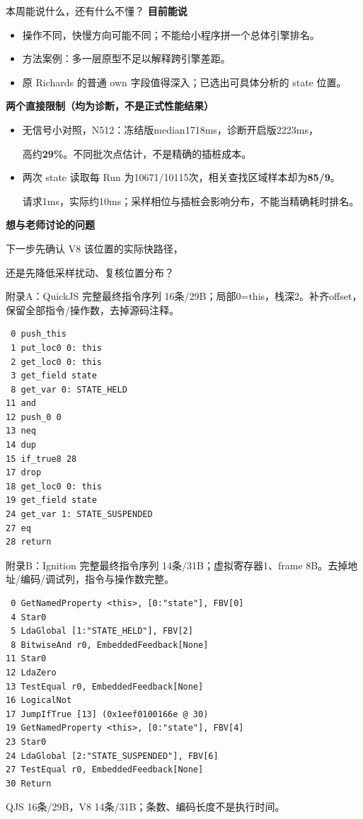 \documentclass[UTF8,aspectratio=169,10pt,fontset=fandol]{ctexbeamer}
\newcommand{\DiagNote}{诊断数据，不作正式性能结果。}
\newcommand{\PageSource}{}
\newcommand{\PageMode}{}
\newcommand{\PageMeta}[2]{\gdef\PageSource{#1}\gdef\PageMode{#2}}
\begin{document}
\PageMeta{S1/S2 正式汇总；S3 perturbation.json、site\_samples.csv、N1计数。}{\DiagNote}
\begin{frame}[t]{本周能说什么，还有什么不懂？}
\textbf{目前能说}
\begin{itemize}
  \setlength{\itemsep}{2pt}
  \item 操作不同，快慢方向可能不同；不能给小程序拼一个总体引擎排名。
  \item 方法案例：多一层原型不足以解释跨引擎差距。
  \item 原 Richards 的普通 own 字段值得深入；已选出可具体分析的 state 位置。
\end{itemize}
\smallskip
\textbf{两个直接限制（均为诊断，不是正式性能结果）}
\begin{itemize}
  \setlength{\itemsep}{3pt}
  \item 无信号小对照，N512：冻结版median1718ms，诊断开启版2223ms，\par
        高约\textbf{29\%}。不同批次点估计，不是精确的插桩成本。
  \item 两次 state 读取每 Run 为10671/10115次，相关查找区域样本却为\textbf{85/9}。\par
        请求1ms，实际约10ms；采样相位与插桩会影响分布，不能当精确耗时排名。
\end{itemize}
\medskip
\textbf{想与老师讨论的问题}\par
下一步先确认 V8 该位置的实际快路径，\par
还是先降低采样扰动、复核位置分布？
\end{frame}

\appendix
\PageMeta{S3：QuickJS 完整目标函数 dump 与 decoded.json；见 notes.md。}{\DiagNote}
\begin{frame}[fragile,t]{附录A：QuickJS 完整最终指令序列}
\small 16条/29B；局部0=this，栈深2。补齐offset，保留全部指令/操作数，去掉源码注释。
\begin{lstlisting}
 0 push_this
 1 put_loc0 0: this
 2 get_loc0 0: this
 3 get_field state
 8 get_var 0: STATE_HELD
11 and
12 push_0 0
13 neq
14 dup
15 if_true8 28
17 drop
18 get_loc0 0: this
19 get_field state
24 get_var 1: STATE_SUSPENDED
27 eq
28 return
\end{lstlisting}
\end{frame}

\PageMeta{S3：同进程 V8 完整目标函数 dump；IC地址映射见 notes.md。}{\DiagNote}
\begin{frame}[fragile,t]{附录B：Ignition 完整最终指令序列}
\small 14条/31B；虚拟寄存器1、frame 8B。去掉地址/编码/调试列，指令与操作数完整。
\begin{lstlisting}
 0 GetNamedProperty <this>, [0:"state"], FBV[0]
 4 Star0
 5 LdaGlobal [1:"STATE_HELD"], FBV[2]
 8 BitwiseAnd r0, EmbeddedFeedback[None]
11 Star0
12 LdaZero
13 TestEqual r0, EmbeddedFeedback[None]
16 LogicalNot
17 JumpIfTrue [13] (0x1eef0100166e @ 30)
19 GetNamedProperty <this>, [0:"state"], FBV[4]
23 Star0
24 LdaGlobal [2:"STATE_SUSPENDED"], FBV[6]
27 TestEqual r0, EmbeddedFeedback[None]
30 Return
\end{lstlisting}
\small QJS 16条/29B，V8 14条/31B；条数、编码长度不是执行时间。
\end{frame}
\end{document}
